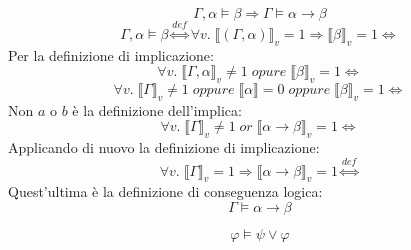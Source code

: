 \documentclass{article}
\theoremstyle{break}
\theoremstyle{break}
\theoremstyle{break}
\theoremstyle{break}
\begin{document}
\begin{exercise}[a casa]
  \[
    \Gamma,\alpha \models \beta \Rightarrow \Gamma \models \alpha \to \beta
  \]
  \[
    \Gamma,\alpha \models \beta \stackrel{def}{\Leftrightarrow} \forall v.\; \llbracket (\Gamma,\alpha)\rrbracket_v=1 \Rightarrow \llbracket \beta\rrbracket_v=1 \Leftrightarrow
  \]
  Per la definizione di implicazione:
  \[
    \forall v.\; \llbracket \Gamma,\alpha\rrbracket_v \neq 1\; opure\; \llbracket \beta\rrbracket_v=1 \Leftrightarrow
  \] 
  \[
    \forall v.\; \llbracket \Gamma\rrbracket_v \neq 1\; oppure\; \llbracket \alpha\rrbracket = 0\; oppure\; \llbracket \beta\rrbracket_v=1 \Leftrightarrow
  \] 
  Non \( a \) o \( b \) è la definizione dell'implica:
  \[
    \forall v.\; \llbracket \Gamma\rrbracket_v \neq 1\; or\; \llbracket \alpha \to \beta\rrbracket_v=1 \Leftrightarrow
  \] 
  Applicando di nuovo la definizione di implicazione:
  \[
    \forall v.\; \llbracket \Gamma\rrbracket_v=1 \Rightarrow \llbracket \alpha \to \beta\rrbracket_v=1 \stackrel{def}{\Leftrightarrow}
  \] 
  Quest'ultima è la definizione di conseguenza logica:
  \[
    \Gamma \models \alpha \to \beta
  \] 
\end{exercise}
\begin{exercise}[a casa]
  \[
    \varphi \models \psi \vee \varphi
  \]
\end{exercise}
\end{document}
